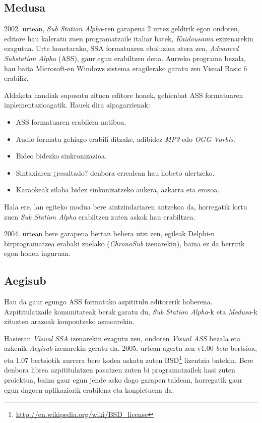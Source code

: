 
\subsection{Medusa}
2002. urtean, \textit{Sub Station Alpha}-ren garapena 2 urtez geldirik egon ondoren, editore hau kaleratu zuen programatzaile italiar batek, \textit{Kaidousama} ezizenarekin ezagutua. Urte honetarako, SSA formatuaren eboluzioa atera zen, \textit{Advanced Substation Alpha} (ASS), gaur egun erabiltzen dena. Aurreko programa bezala, hau baita Microsoft-en Windows sistema eragilerako garatu zen Visual Basic 6 erabiliz.

Aldaketa handiak suposatu zituen editore honek, gehienbat ASS formatuaren inplementazioagatik. Hauek dira aipagarrienak:
\begin{itemize}
\item ASS formatuaren erabilera natiboa.
\item Audio formatu gehiago erabili ditzake, adibidez \textit{MP3} edo \textit{OGG Vorbis}.
\item Bideo bidezko sinkronizazioa.
\item Sintaxiaren ¿resaltado? denbora errealean hau hobeto ulertzeko.
\item Karaokeak silaba bidez sinkonizatzeko aukera, azkarra eta erosoa.
\end{itemize}

Hala ere, lan egiteko modua bere aintzindariaren antzekoa da, horregatik lortu zuen \textit{Sub Station Alpha} erabiltzen zuten askok hau erabiltzea.


2004. urtean bere garapena bertan behera utzi zen, egileak Delphi-n birprogramatzea erabaki zuelako (\textit{ChronoSub} izenarekin), baina ez da berririk egon honen inguruan.
\subsection{Aegisub}
Hau da gaur egungo ASS formatuko azpititulu editorerik hoberena. Azpititulatzaile komunitateak berak garatu du, \textit{Sub Station Alpha}-k eta \textit{Medusa}-k zituzten arazoak konpontzeko asmoarekin.

Hasieran \textit{Visual SSA} izenarekin ezagutu zen, ondoren \textit{Visual ASS} bezala eta azkenik \textit{Aegisub} izenarekin geratu da. 2005. urtean agertu zen v1.00 \textit{beta} bertsioa, eta 1.07 bertsiotik aurrera bere kodea askatu zuten BSD\footnote{\url{http://en.wikipedia.org/wiki/BSD_license}} lizentzia batekin. Bere denbora librea azpititulatzen pasatzen zuten bi programatzailek hasi zuten proiektua, baina gaur egun jende asko dago garapen taldean, horregatik gaur egun dagoen aplikaziorik erabilena eta konpletuena da.

